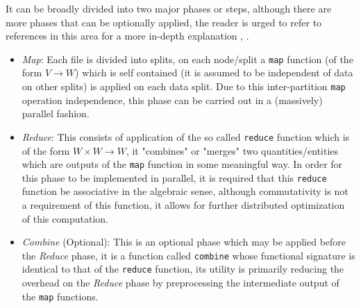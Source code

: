 It can be broadly divided into two major phases or steps, although there are more phases that can be optionally applied, the reader is urged to refer to references in this area for a more in-depth explanation \cite{HDFS}, \cite{HadoopBook} \cite{Yarn}.

\begin{itemize}
\item \textit{Map}: Each file is divided into splits, on each node/split a \texttt{map} function (of the form $V \longrightarrow W$) which is self contained (it is assumed to be independent of data on other splits) is applied on each data split. Due to this inter-partition \texttt{map} operation independence, this phase can be carried out in a (massively) parallel fashion.

\item \textit{Reduce}: This consists of application of the so called \texttt{reduce} function which is of the form $W \times W \longrightarrow W$, it "combines" or "merges" two quantities/entities which are outputs of the \texttt{map} function in some meaningful way. In order for this phase to be implemented in parallel, it is required that this \texttt{reduce} function be associative in the algebraic sense, although commutativity is not a requirement of this function, it allows for further distributed optimization of this computation.

\item \textit{Combine} (Optional): This is an optional phase which may be applied before the \textit{Reduce} phase, it is a function called \texttt{combine} whose functional signature is identical to that of the \texttt{reduce} function, its utility is primarily reducing the overhead on the \textit{Reduce} phase by preprocessing the intermediate output of the \texttt{map} functions. 
\end{itemize}


